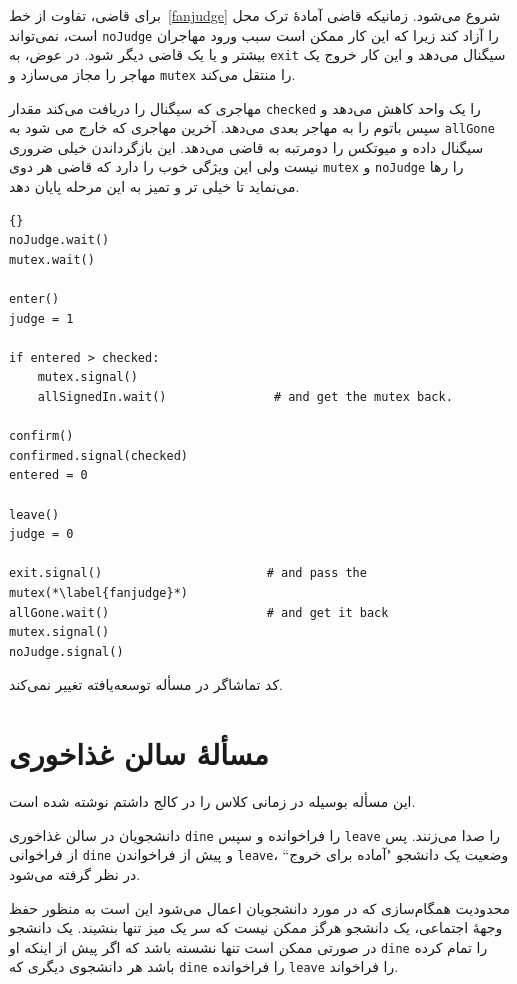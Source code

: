 \documentclass{book}
\newcommand{\clearemptydoublepage}{}%
\begin{document}
    برای قاضی، تفاوت از خط~\ref{fanjudge} شروع می‌شود. زمانیکه قاضی آمادهٔ ترک محل است، نمی‌تواند  {\tt noJudge} را آزاد کند زیرا که 
    این کار ممکن است سبب ورود مهاجران بیشتر و یا یک قاضی دیگر شود.  در عوض،  به {\tt exit} سیگنال می‌دهد و این کار خروج یک مهاجر را 
    مجاز می‌سازد و  {\tt mutex} را منتقل می‌کند. 
    
    مهاجری که سیگنال را دریافت می‌کند مقدار  {\tt checked} را یک واحد کاهش می‌دهد و سپس باتوم را به مهاجر بعدی می‌دهد. 
    آخرین مهاجری که خارج می شود به {\tt allGone} سیگنال داده و میوتکس را دومرتبه به قاضی می‌دهد. این بازگرداندن خیلی ضروری نیست ولی 
    این ویژگی خوب را دارد که قاضی هر دوی  {\tt mutex} و {\tt noJudge}  را رها می‌نماید تا خیلی تر و تمیز به این مرحله پایان دهد. 

\newpage
\begin{latin}
\begin{lstlisting}[title=\rl{راهنمایی مسألهٔ تالار \lr{Faneuil} (قاضی)}]{}
noJudge.wait()
mutex.wait()

enter()
judge = 1

if entered > checked:
    mutex.signal()
    allSignedIn.wait()               # and get the mutex back.

confirm()
confirmed.signal(checked)
entered = 0

leave()
judge = 0

exit.signal()                       # and pass the mutex(*\label{fanjudge}*)
allGone.wait()                      # and get it back
mutex.signal()
noJudge.signal()
\end{lstlisting}
\end{latin}

    کد تماشاگر در مسأله توسعه‌یافته تغییر نمی‌کند. 


\clearemptydoublepage
\section{مسألهٔ سالن غذاخوری}

    این مسأله بوسیله  در زمانی کلاس  را در کالج  داشتم نوشته شده است. 

    دانشجویان در سالن غذاخوری  {\tt dine} را فراخوانده و سپس {\tt leave} را صدا می‌زنند. 
    پس از فراخوانی  {\tt dine}  و پیش از فراخواندن {\tt leave}، وضعیت یک دانشجو "آماده برای خروج`` در نظر گرفته می‌شود. 

    محدودیت‌ همگام‌سازی که در مورد دانشجویان اعمال می‌شود این است به منظور حفظ وجههٔ اجتماعی، یک دانشجو هرگز ممکن نیست که سر 
    یک میز تنها بنشیند. یک دانشجو در صورتی ممکن است تنها نشسته باشد که  اگر پیش از اینکه او {\tt dine} را تمام کرده باشد
    هر  دانشجوی دیگری که {\tt dine} را فراخوانده‌ {\tt leave} را فراخواند. 
\end{document}
